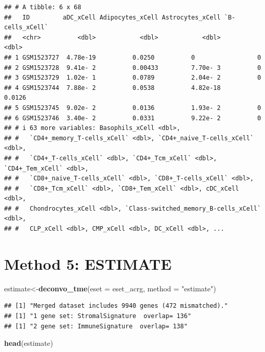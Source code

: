 \documentclass[
  12pt,
]{book}
\newenvironment{Shaded}{\begin{snugshade}}{\end{snugshade}}
\newcommand{\AttributeTok}[1]{\textcolor[rgb]{0.13,0.29,0.53}{#1}}
\newcommand{\FunctionTok}[1]{\textcolor[rgb]{0.13,0.29,0.53}{\textbf{#1}}}
\newcommand{\NormalTok}[1]{#1}
\newcommand{\OtherTok}[1]{\textcolor[rgb]{0.56,0.35,0.01}{#1}}
\newcommand{\StringTok}[1]{\textcolor[rgb]{0.31,0.60,0.02}{#1}}
\begin{document}
\begin{verbatim}
## # A tibble: 6 x 68
##   ID         aDC_xCell Adipocytes_xCell Astrocytes_xCell `B-cells_xCell`
##   <chr>          <dbl>            <dbl>            <dbl>           <dbl>
## 1 GSM1523727  4.78e-19          0.0250          0                 0     
## 2 GSM1523728  9.41e- 2          0.00433         7.70e- 3          0     
## 3 GSM1523729  1.02e- 1          0.0789          2.04e- 2          0     
## 4 GSM1523744  7.88e- 2          0.0538          4.82e-18          0.0126
## 5 GSM1523745  9.02e- 2          0.0136          1.93e- 2          0     
## 6 GSM1523746  3.40e- 2          0.0331          9.22e- 2          0     
## # i 63 more variables: Basophils_xCell <dbl>,
## #   `CD4+_memory_T-cells_xCell` <dbl>, `CD4+_naive_T-cells_xCell` <dbl>,
## #   `CD4+_T-cells_xCell` <dbl>, `CD4+_Tcm_xCell` <dbl>, `CD4+_Tem_xCell` <dbl>,
## #   `CD8+_naive_T-cells_xCell` <dbl>, `CD8+_T-cells_xCell` <dbl>,
## #   `CD8+_Tcm_xCell` <dbl>, `CD8+_Tem_xCell` <dbl>, cDC_xCell <dbl>,
## #   Chondrocytes_xCell <dbl>, `Class-switched_memory_B-cells_xCell` <dbl>,
## #   CLP_xCell <dbl>, CMP_xCell <dbl>, DC_xCell <dbl>, ...
\end{verbatim}

\hypertarget{method-5-estimate}{%
\section{Method 5: ESTIMATE}\label{method-5-estimate}}

\begin{Shaded}
\begin{Highlighting}[]
\NormalTok{estimate}\OtherTok{\textless{}{-}}\FunctionTok{deconvo\_tme}\NormalTok{(}\AttributeTok{eset =}\NormalTok{ eset\_acrg, }\AttributeTok{method =} \StringTok{"estimate"}\NormalTok{)}
\end{Highlighting}
\end{Shaded}

\begin{verbatim}
## [1] "Merged dataset includes 9940 genes (472 mismatched)."
## [1] "1 gene set: StromalSignature  overlap= 136"
## [1] "2 gene set: ImmuneSignature  overlap= 138"
\end{verbatim}

\begin{Shaded}
\begin{Highlighting}[]
\FunctionTok{head}\NormalTok{(estimate)}
\end{Highlighting}
\end{Shaded}
\end{document}

